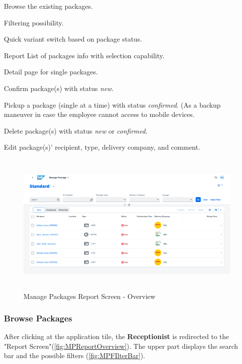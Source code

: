 \begin{compactenum}
	\item Browse the existing packages.
        \begin{compactenum}
            \item Filtering possibility.
            \item Quick variant switch based on package status.
            \item Report List of packages info with selection capability.
            \item Detail page for single packages.
        \end{compactenum}
    \item Confirm package(s) with status \textit{new}.
    \item Pickup a package (single at a time) with status \textit{confirmed}. (As a backup maneuver in case the employee cannot access to mobile devices.
    \item Delete package(s) with status \textit{new} or \textit{confirmed}.
    \item Edit package(s)' recipient, type, delivery company, and comment.
\end{compactenum}

\bigskip
\begin{figure}[H]
	\centering
	\includegraphics[height=200pt]{images/user_doc/managePack/ReportScreen/browse/Overview.png}
	\caption{Manage Packages Report Screen - Overview}
	\label{fig:MPReportOverview}
\end{figure}


\subsubsection{Browse Packages}
After clicking at the application tile, the \textbf{Receptionist} is redirected to the "Report Screen"(\autoref{fig:MPReportOverview}). 
The upper part displays the search bar and the possible filters (\autoref{fig:MPFIlterBar}). 

